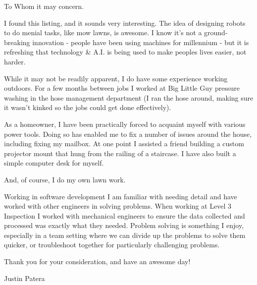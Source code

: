 
To Whom it may concern.

\smallskip

I found this listing, and it sounds very interesting.
The idea of designing robots to do menial tasks, like mow lawns, is awesome.
I know it's not a ground-breaking innovation - people have been using machines for millennium - but it is refreshing that technology \& A.I. is being used to make peoples lives easier, not harder.

\smallskip

While it may not be readily apparent, I do have some experience working outdoors.
For a few months between jobs I worked at Big Little Guy pressure washing in the hose management department (I ran the hose around, making sure it wasn't kinked so the jobs could get done effectively).

\smallskip

As a homeowner, I have been practically forced to acquaint myself with various power tools.
Doing so has enabled me to fix a number of issues around the house, including fixing my mailbox.
At one point I assisted a friend building a custom projector mount that hung from the railing of a staircase.
I have also built a simple computer desk for myself.

\smallskip

And, of course, I do my own lawn work.

\smallskip

Working in software development I am familiar with needing detail and have worked with other engineers in solving problems.
When working at Level 3 Inspection I worked with mechanical engineers to ensure the data collected and processed was exactly what they needed.
Problem solving is something I enjoy, especially in a team setting where we can divide up the problems to solve them quicker, or troubleshoot together for particularly challenging problems.

\smallskip

Thank you for your consideration, and have an awesome day!

\smallskip

Justin Patera

